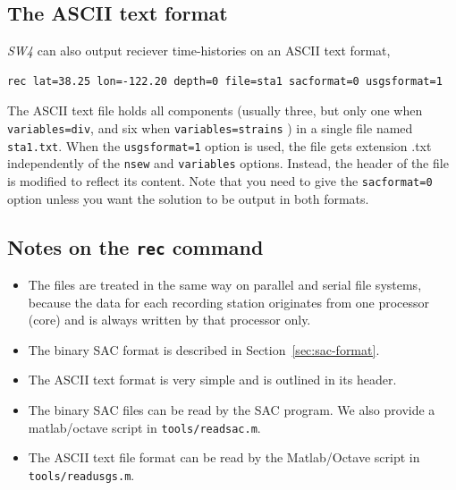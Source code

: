 \documentclass[11pt]{report}
\begin{document}

\subsection{The ASCII text format}
\emph{SW4} can also output reciever time-histories on an ASCII text format,
\begin{verbatim}
rec lat=38.25 lon=-122.20 depth=0 file=sta1 sacformat=0 usgsformat=1
\end{verbatim}
The ASCII text file holds all components (usually three, but only one when {\tt
  variables=div}, and six when {\tt variables=strains} ) in a single file named {\tt sta1.txt}. When
the \verb+usgsformat=1+ option is used, the file gets extension .txt independently of the
\verb+nsew+ and \verb+variables+ options.  Instead, the header of the file is modified to reflect
its content. Note that you need to give the \verb+sacformat=0+ option unless you want the solution
to be output in both formats.

\subsection{Notes on the {\tt rec} command}
\begin{itemize}
\item The files are treated in the same way on parallel and serial file systems, because the data
  for each recording station originates from one processor (core) and is always written by that processor only.
\item The binary SAC format is described in Section~\ref{sec:sac-format}.
\item The ASCII text format is very simple and is outlined in its header.
\item The binary SAC files can be read by the SAC program. We also provide a matlab/octave script in
  {\tt tools/readsac.m}.
\item The ASCII text file format can be read by the Matlab/Octave script in {\tt tools/readusgs.m}.
\end{itemize}
\end{document}
